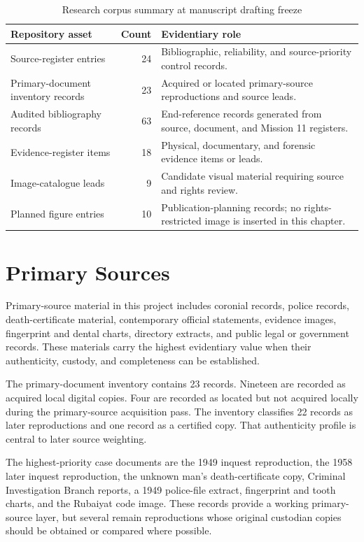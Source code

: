 \begin{table}[htbp]
\centering
\caption{Research corpus summary at manuscript drafting freeze}
\label{tab:sources-corpus-summary}
\begin{tabularx}{\textwidth}{p{}rX}
\toprule
Repository asset & Count & Evidentiary role \\
\midrule
Source-register entries & 24 & Bibliographic, reliability, and source-priority control records. \\
Primary-document inventory records & 23 & Acquired or located primary-source reproductions and source leads. \\
Audited bibliography records & 63 & End-reference records generated from source, document, and Mission 11 registers. \\
Evidence-register items & 18 & Physical, documentary, and forensic evidence items or leads. \\
Image-catalogue leads & 9 & Candidate visual material requiring source and rights review. \\
Planned figure entries & 10 & Publication-planning records; no rights-restricted image is inserted in this chapter. \\
\bottomrule
\end{tabularx}
\end{table}

\section{Primary Sources}

Primary-source material in this project includes coronial records, police records, death-certificate material, contemporary official statements, evidence images, fingerprint and dental charts, directory extracts, and public legal or government records. These materials carry the highest evidentiary value when their authenticity, custody, and completeness can be established.

The primary-document inventory contains 23 records. Nineteen are recorded as acquired local digital copies. Four are recorded as located but not acquired locally during the primary-source acquisition pass. The inventory classifies 22 records as later reproductions and one record as a certified copy. That authenticity profile is central to later source weighting.

The highest-priority case documents are the 1949 inquest reproduction, the 1958 later inquest reproduction, the unknown man's death-certificate copy, Criminal Investigation Branch reports, a 1949 police-file extract, fingerprint and tooth charts, and the Rubaiyat code image. These records provide a working primary-source layer, but several remain reproductions whose original custodian copies should be obtained or compared where possible.

